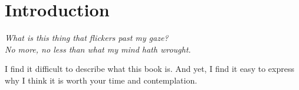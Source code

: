 

\part*{Introduction}


\begin{displayquote}
\textit{What is this thing that flickers past my gaze? \\
	No more, no less than what my mind hath wrought.}
\vspace{4mm}
\end{displayquote}

I find it difficult to describe what this book is. And yet, I find it easy to express why I think it is worth your time and contemplation.



